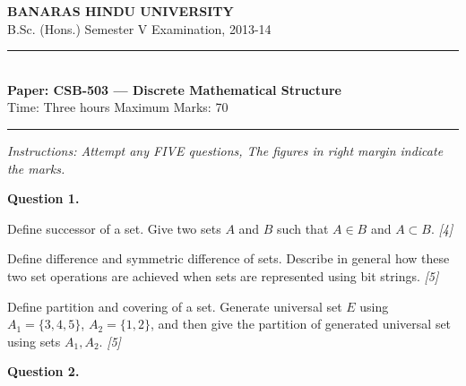 \documentclass[11pt,a4paper]{article}
\newcommand{\pts}[1]{\hfill   \textit{[#1]}}
\begin{document}
\begin{center}
  {\large\bfseries BANARAS HINDU UNIVERSITY}\\[2pt]
  {\normalsize B.Sc. (Hons.) Semester V Examination, 2013-14}\\[6pt]
  \rule{0.8\linewidth}{0.5pt}\\[6pt]
  {\large\bfseries Paper: CSB-503 --- Discrete Mathematical Structure}\\[4pt]
  {\normalsize Time: Three hours \hfill Maximum Marks: 70}
\end{center}

\rule{\linewidth}{0.4pt}

\smallskip



\noindent   \textit{Instructions: Attempt any FIVE questions, The figures in right margin indicate the marks.}

\bigskip

\medskip


\noindent   \textbf{Question 1.}

\begin{parts}
  \item Define successor of a set. Give two sets $A$ and $B$ such that $A \in B$ and $A \subset B$. \pts{4}
  \item Define difference and symmetric difference of sets. Describe in general how these two set operations are achieved when sets are represented using bit strings. \pts{5}
  \item Define partition and covering of a set. Generate universal set $E$ using $A_1 = \{3, 4, 5\}$, $A_2 = \{1, 2\}$, and then give the partition of generated universal set using sets $A_1, A_2$. \pts{5}
\end{parts}

\medskip


\noindent   \textbf{Question 2.}
\end{document}
